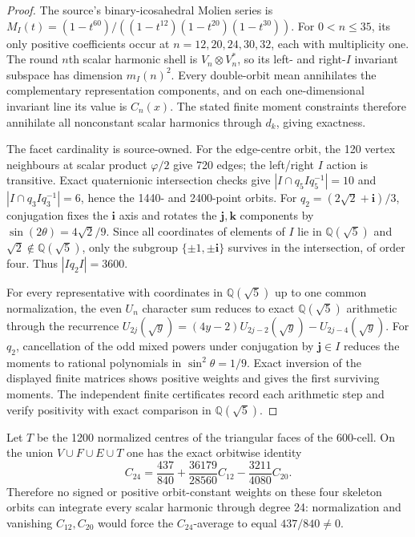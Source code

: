 \documentclass[11pt]{article}
\begin{document}
\begin{proof}
The source's binary-icosahedral Molien series is
$M_I(t)=(1-t^{60})/((1-t^{12})(1-t^{20})(1-t^{30}))$.
For $0<n\le35$, its only positive coefficients occur at
$n=12,20,24,30,32$, each with multiplicity one.
The round $n$th scalar harmonic shell is $V_n\otimes V_n^*$,
so its left- and right-$I$ invariant subspace has dimension $m_I(n)^2$.
Every double-orbit mean annihilates the complementary representation
components, and on each one-dimensional invariant line its value is
$C_n(x)$. The stated finite moment constraints therefore annihilate all
nonconstant scalar harmonics through $d_k$, giving exactness.

The facet cardinality is source-owned. For the edge-centre orbit, the
120 vertex neighbours at scalar product $\varphi/2$ give 720 edges;
the left/right $I$ action is transitive. Exact quaternionic intersection
checks give $|I\cap q_5Iq_5^{-1}|=10$ and
$|I\cap q_3Iq_3^{-1}|=6$, hence the 1440- and 2400-point orbits.
For $q_2=(2\sqrt2+\mathbf i)/3$, conjugation fixes the
$\mathbf i$ axis and rotates the $\mathbf j,\mathbf k$ components by
$\sin(2\theta)=4\sqrt2/9$. Since all coordinates of elements of $I$
lie in $\mathbb Q(\sqrt5)$ and $\sqrt2\notin\mathbb Q(\sqrt5)$,
only the subgroup $\{\pm1,\pm\mathbf i\}$ survives in the intersection,
of order four. Thus $|Iq_2I|=3600$.

For every representative with coordinates in $\mathbb Q(\sqrt5)$ up to
one common normalization, the even $U_n$ character sum reduces to exact
$\mathbb Q(\sqrt5)$ arithmetic through the recurrence
$U_{2j}(\sqrt y)=(4y-2)U_{2j-2}(\sqrt y)-U_{2j-4}(\sqrt y)$.
For $q_2$, cancellation of the odd mixed powers under conjugation by
$\mathbf j\in I$ reduces the moments to rational polynomials in
$\sin^2\theta=1/9$. Exact inversion of the displayed finite matrices
shows positive weights and gives the first surviving moments.
The independent finite certificates record each arithmetic step and
verify positivity with exact comparison in $\mathbb Q(\sqrt5)$.
\end{proof}

\begin{proposition}
\label{p1b:prop:cc110-skeleton-24-obstruction}
Let $T$ be the 1200 normalized centres of the triangular faces of the
600-cell. On the union $V\cup F\cup E\cup T$ one has the exact
orbitwise identity
\[
\boxed{C_{24}=\frac{437}{840}+\frac{36179}{28560}C_{12}
-\frac{3211}{4080}C_{20}.}
\]
Therefore no signed or positive orbit-constant weights on these four
skeleton orbits can integrate every scalar harmonic through degree 24:
normalization and vanishing $C_{12},C_{20}$ would force the
$C_{24}$-average to equal $437/840\ne0$.
\end{proposition}
\end{document}
